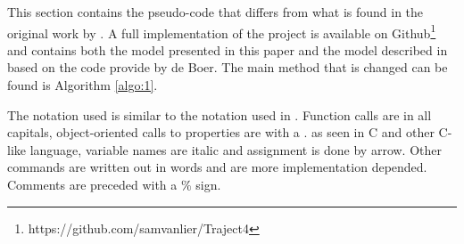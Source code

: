 This section contains the pseudo-code that differs from what is found in the original work by \cite{de2010multi}.
A full implementation of the project is available on Github\footnote{https://github.com/samvanlier/Traject4} and contains both the model presented in this paper and the model described in \citep{de2010multi} based on the code provide by de Boer.
The main method that is changed can be found is Algorithm \autoref{algo:1}.

The notation used is similar to the notation used in \citep*{de2010multi}.
Function calls are in all capitals, object-oriented calls to properties are with a . as seen in C and other C-like language, variable names are italic and assignment is done by arrow.
Other commands are written out in words and are more implementation depended.
Comments are preceded with a $\%$ sign.

